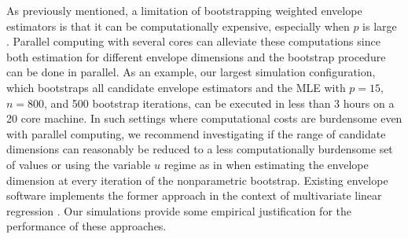 \documentclass{article}\usepackage[]{graphicx}\usepackage[]{color}
\begin{document}
As previously mentioned, a limitation of bootstrapping weighted envelope estimators is that it can be computationally expensive, especially when $p$ is large \citep{yau2019hypothesis}. Parallel computing with several cores can alleviate these computations since both estimation for different envelope dimensions and the bootstrap procedure can be done in parallel. As an example, our largest simulation configuration, which bootstraps all candidate envelope estimators and the MLE with $p=15$, $n=800$, and 500 bootstrap iterations, can be executed in less than 3 hours on a 20 core machine. 
In such settings where computational costs are burdensome even with parallel computing, we recommend investigating if the range of candidate dimensions can reasonably be reduced to a less computationally burdensome set of values or using the variable $u$ regime as in \cite{zhangmai} when estimating the envelope dimension at every iteration of the nonparametric bootstrap. Existing envelope software implements the former approach in the context of multivariate linear regression \citep{lee2019Renvlp}. Our simulations provide some empirical justification for the performance of these approaches.
\end{document}
